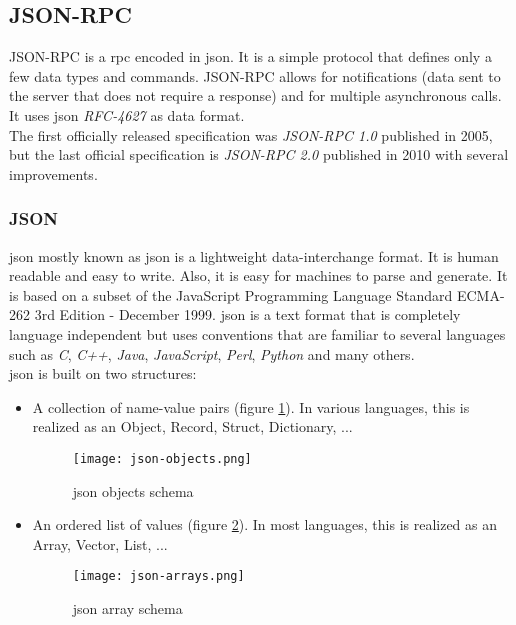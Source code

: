 \subsection{JSON-RPC}
JSON-RPC is a \acrfull{rpc} encoded in \acrshort{json}. It is a simple protocol that defines only a few data types and commands. JSON-RPC allows for notifications (data sent to the server that does not require a response) and for multiple asynchronous calls. It uses \acrshort{json} \textit{RFC-4627}\cite{rfc4627} as data format.\\

The first officially released specification was \textit{JSON-RPC 1.0}\cite{json-rpc-1} published in 2005, but the last official specification is \textit{JSON-RPC 2.0}\cite{json-rpc-2} published in 2010 with several improvements.

\subsubsection{JSON}
\acrlong{json} mostly known as \acrshort{json} is a lightweight data-interchange format. It is human readable and easy to write. Also, it is easy for machines to parse and generate. It is based on a subset of the JavaScript Programming Language Standard ECMA-262 3rd Edition - December 1999. \acrshort{json} is a text format that is completely language independent but uses conventions that are familiar to several languages such as \textit{C}, \textit{C++}, \textit{Java}, \textit{JavaScript}, \textit{Perl}, \textit{Python} and many others.\\

\acrshort{json} is built on two structures\cite{jsonSchema}:
\begin{itemize}
    \item A collection of name-value pairs (figure \ref{fig:json_objects}). In various languages, this is realized as an Object, Record, Struct, Dictionary, ...
          \begin{figure}[h]
              \centering
              \texttt{[image: json-objects.png]}
              \caption{\acrshort{json} objects schema}
              \label{fig:json_objects}
          \end{figure}
    \item An ordered list of values (figure \ref{fig:json_arrays}). In most languages, this is realized as an Array, Vector, List, ...
          \begin{figure}[h]
              \centering
              \texttt{[image: json-arrays.png]}
              \caption{\acrshort{json} array schema}
              \label{fig:json_arrays}
          \end{figure}
\end{itemize}

